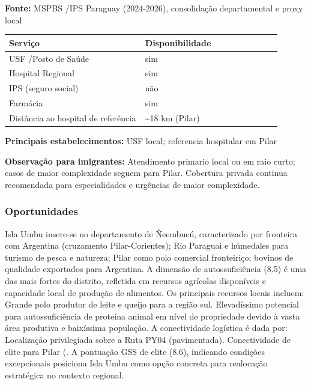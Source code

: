 \textbf{Fonte:} MSPBS /\allowbreak  IPS Paraguay (2024-2026), consolidação
departamental e proxy local

{\def\LTcaptype{none} %
\begin{longtable}{@{}>{\raggedright\arraybackslash}p{0.45\linewidth} >{\raggedright\arraybackslash}p{0.45\linewidth}@{}}
\toprule\noalign{}
Serviço & Disponibilidade \\
\midrule\noalign{}
\endhead
\bottomrule\noalign{}
\endlastfoot
USF /\allowbreak  Posto de Saúde & sim \\
Hospital Regional & sim \\
IPS (seguro social) & não \\
Farmácia & sim \\
Distância ao hospital de referência & \textasciitilde18 km (Pilar) \\
\end{longtable}
}

\textbf{Principais estabelecimentos:} USF local; referencia hospitalar
em Pilar

\textbf{Observação para imigrantes:} Atendimento primario local ou em
raio curto; casos de maior complexidade seguem para Pilar. Cobertura
privada continua recomendada para especialidades e urgências de maior
complexidade.
\newpage

\subsubsection*{Oportunidades}\label{oport-isla-umbu-1208}
Isla Umbu insere-se no departamento de Ñeembucú, caracterizado por fronteira com Argentina (cruzamento Pilar-Corientes); Rio Paraguai e húmedales para turismo de pesca e natureza; Pilar como polo comercial fronteiriço; bovinos de qualidade exportados para Argentina. A dimensão de autossuficiência (8.5) é uma das mais fortes do distrito, refletida em recursos agrícolas disponíveis e capacidade local de produção de alimentos. Os principais recursos locais incluem: Grande polo produtor de leite e queijo para a região sul. Elevadíssimo potencial para autossuficiência de proteína animal em nível de propriedade devido à vasta área produtiva e baixíssima população. A conectividade logística é dada por: Localização privilegiada sobre a Ruta PY04 (pavimentada). Conectividade de elite para Pilar (. A pontuação GSS de elite (8.6), indicando condições excepcionais posiciona Isla Umbu como opção concreta para realocação estratégica no contexto regional.

